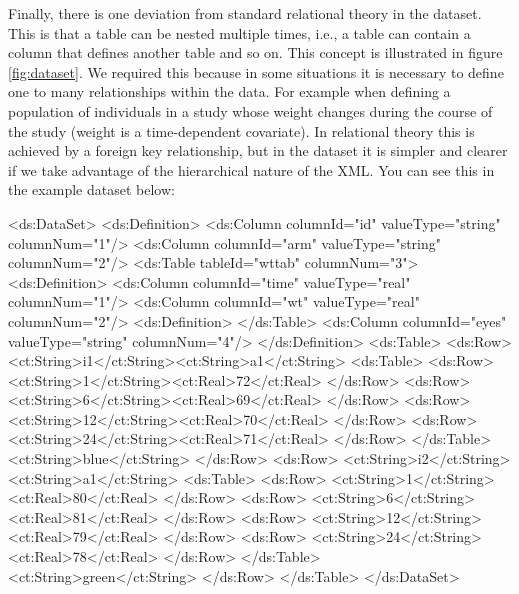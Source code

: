 Finally, there is one deviation from standard relational theory in the
dataset. This is that a table can be nested multiple times, i.e., a
table can contain a column that defines another table and so on. This
concept is illustrated in figure \ref{fig:dataset}. We required this
because in some situations it is necessary to define one to many
relationships within the data. For example when defining a population
of individuals in a study whose weight changes during the course of
the study (weight is a time-dependent covariate). In relational theory
this is achieved by a foreign key relationship, but in the dataset it is
simpler and clearer if we take advantage of the hierarchical nature
of the XML. You can see this in the example dataset below:
%
\begin{xmlcode}
<ds:DataSet>
    <ds:Definition>
        <ds:Column columnId="id" valueType="string" columnNum="1"/>
        <ds:Column columnId="arm" valueType="string" columnNum="2"/>
        <ds:Table tableId="wttab" columnNum="3">
            <ds:Definition>
                <ds:Column columnId="time" valueType="real" columnNum="1"/>
                <ds:Column columnId="wt" valueType="real" columnNum="2"/>
            <ds:Definition>
        </ds:Table>
        <ds:Column columnId="eyes" valueType="string" columnNum="4"/>
    </ds:Definition>
    <ds:Table>
        <ds:Row>
            <ct:String>i1</ct:String><ct:String>a1</ct:String>
            <ds:Table>
                <ds:Row>
                    <ct:String>1</ct:String><ct:Real>72</ct:Real>
                </ds:Row>
                <ds:Row>
                    <ct:String>6</ct:String><ct:Real>69</ct:Real>
                </ds:Row>
                <ds:Row>
                    <ct:String>12</ct:String><ct:Real>70</ct:Real>
                </ds:Row>
                <ds:Row>
                    <ct:String>24</ct:String><ct:Real>71</ct:Real>
                </ds:Row>
            </ds:Table>
            <ct:String>blue</ct:String>
        </ds:Row>
        <ds:Row>
            <ct:String>i2</ct:String><ct:String>a1</ct:String>
            <ds:Table>
                <ds:Row>
                    <ct:String>1</ct:String><ct:Real>80</ct:Real>
                </ds:Row>
                <ds:Row>
                    <ct:String>6</ct:String><ct:Real>81</ct:Real>
                </ds:Row>
                <ds:Row>
                    <ct:String>12</ct:String><ct:Real>79</ct:Real>
                </ds:Row>
                <ds:Row>
                    <ct:String>24</ct:String><ct:Real>78</ct:Real>
                </ds:Row>
            </ds:Table>
            <ct:String>green</ct:String>
        </ds:Row>
    </ds:Table>
</ds:DataSet>
\end{xmlcode}
